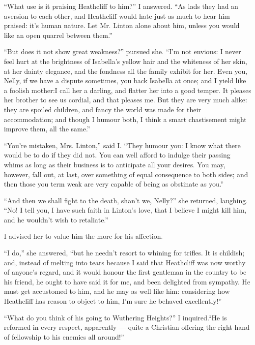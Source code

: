 \par “What use is it praising Heathcliff to him?” I answered. “As lads they had an aversion to each other, and Heathcliff would hate just as much to hear him praised: it's human nature. Let Mr. Linton alone about him, unless you would like an open quarrel between them.”
\par “But does it not show great weakness?” pursued she. “I'm not envious: I never feel hurt at the brightness of Isabella's yellow hair and the whiteness of her skin, at her dainty elegance, and the fondness all the family exhibit for her. Even you, Nelly, if we have a dispute sometimes, you back Isabella at once; and I yield like a foolish mother:I call her a darling, and flatter her into a good temper. It pleases her brother to see us cordial, and that pleases me. But they are very much alike: they are spoiled children, and fancy the world was made for their accommodation; and though I humour both, I think a smart chastisement might improve them, all the same.”
\par “You're mistaken, Mrs. Linton,” said I. “They humour you: I know what there would be to do if they did not. You can well afford to indulge their passing whims as long as their business is to anticipate all your desires. You may, however, fall out, at last, over something of equal consequence to both sides; and then those you term weak are very capable of being as obstinate as you.”
\par “And then we shall fight to the death, shan't we, Nelly?” she returned, laughing. “No! I tell you, I have such faith in Linton's love, that I believe I might kill him, and he wouldn't wish to retaliate.”
\par I advised her to value him the more for his affection.
\par “I do,” she answered, “but he needn't resort to whining for trifles. It is childish; and, instead of melting into tears because I said that Heathcliff was now worthy of anyone's regard, and it would honour the first gentleman in the country to be his friend, he ought to have said it for me, and been delighted from sympathy. He must get accustomed to him, and he may as well like him: considering how Heathcliff has reason to object to him, I'm sure he behaved excellently!”
\par “What do you think of his going to Wuthering Heights?” I inquired.“He is reformed in every respect, apparently — quite a Christian offering the right hand of fellowship to his enemies all around!”
